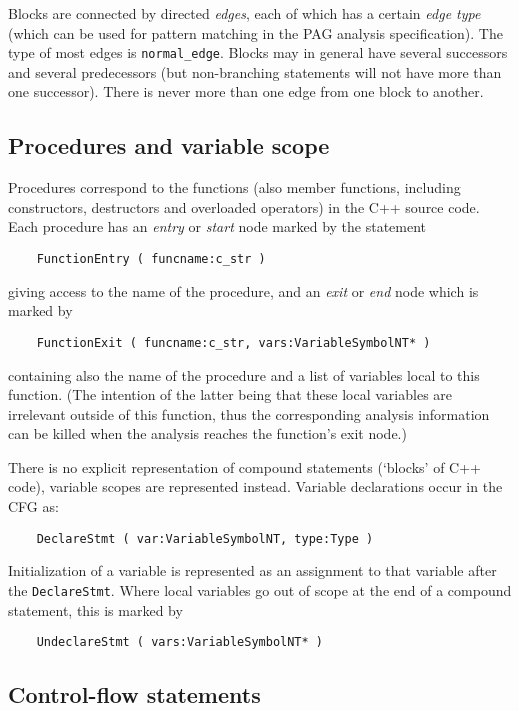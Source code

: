 \documentclass[12pt]{article}
\begin{document}
Blocks are connected by directed \emph{edges}, each of which has a
certain \emph{edge type} (which can be used for pattern matching in
the PAG analysis specification). The type of most edges is
\verb|normal_edge|. Blocks may in general have several successors
and several predecessors (but non-branching statements will
not have more than one successor). There is never more than one edge
from one block to another.

\subsection{Procedures and variable scope}

Procedures correspond to the functions (also member functions,
including constructors, destructors and overloaded operators) in the
C++ source code. Each procedure has an \emph{entry} or \emph{start}
node marked by the statement
\begin{verbatim}
    FunctionEntry ( funcname:c_str )
\end{verbatim}
giving access to the name of the procedure, and an \emph{exit} or
\emph{end} node which is marked by
\begin{verbatim}
    FunctionExit ( funcname:c_str, vars:VariableSymbolNT* )
\end{verbatim}
containing also the name of the procedure and a list of variables
local to this function. (The intention of the latter being that
these local variables are irrelevant outside of this function, thus
the corresponding analysis information can be killed when the
analysis reaches the function's exit node.)

There is no explicit representation of compound statements (`blocks'
of C++ code), variable scopes are represented instead. Variable
declarations occur in the CFG as:
\begin{verbatim}
    DeclareStmt ( var:VariableSymbolNT, type:Type )
\end{verbatim}
Initialization of a variable is represented as an assignment to that
variable after the \verb|DeclareStmt|. Where local variables go out
of scope at the end of a compound statement, this is marked by
\begin{verbatim}
    UndeclareStmt ( vars:VariableSymbolNT* )
\end{verbatim}

\subsection{Control-flow statements}
\end{document}
